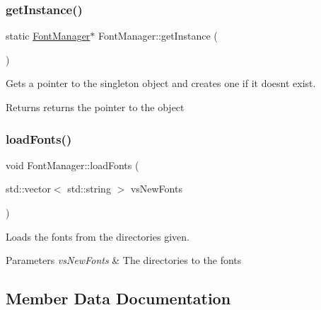 \subsubsection{\texorpdfstring{get\+Instance()}{getInstance()}}
{\footnotesize\ttfamily static \hyperlink{class_font_manager}{Font\+Manager}$\ast$ Font\+Manager\+::get\+Instance (\begin{DoxyParamCaption}{ }\end{DoxyParamCaption})\hspace{0.3cm}{\ttfamily [static]}}



Gets a pointer to the singleton object and creates one if it doesnt exist. 

\begin{DoxyReturn}{Returns}
returns the pointer to the object 
\end{DoxyReturn}
\mbox{\label{class_font_manager_a43efb3f494fecb26dd6974a5c8b3afec}} 
\subsubsection{\texorpdfstring{load\+Fonts()}{loadFonts()}}
{\footnotesize\ttfamily void Font\+Manager\+::load\+Fonts (\begin{DoxyParamCaption}\item[{std\+::vector$<$ std\+::string $>$}]{vs\+New\+Fonts }\end{DoxyParamCaption})}



Loads the fonts from the directories given. 


\begin{DoxyParams}{Parameters}
{\em vs\+New\+Fonts} & The directories to the fonts \\
\hline
\end{DoxyParams}


\subsection{Member Data Documentation}
\mbox{\label{class_font_manager_a5cc819b9be6824549bf4b3de39b1207b}} 

